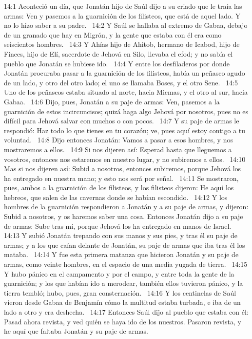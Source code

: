 14:1 Aconteció un día, que Jonatán hijo de Saúl dijo a su criado que le traía las armas: Ven y pasemos a la guarnición de los filisteos, que está de aquel lado. Y no lo hizo saber a su padre.  
14:2 Y Saúl se hallaba al extremo de Gabaa, debajo de un granado que hay en Migrón, y la gente que estaba con él era como seiscientos hombres.  
14:3 Y Ahías hijo de Ahitob, hermano de Icabod, hijo de Finees, hijo de Elí, sacerdote de Jehová en Silo, llevaba el efod; y no sabía el pueblo que Jonatán se hubiese ido.  
14:4 Y entre los desfiladeros por donde Jonatán procuraba pasar a la guarnición de los filisteos, había un peñasco agudo de un lado, y otro del otro lado; el uno se llamaba Boses, y el otro Sene.  
14:5 Uno de los peñascos estaba situado al norte, hacia Micmas, y el otro al sur, hacia Gabaa.  
14:6 Dijo, pues, Jonatán a su paje de armas: Ven, pasemos a la guarnición de estos incircuncisos; quizá haga algo Jehová por nosotros, pues no es difícil para Jehová salvar con muchos o con pocos.  
14:7 Y su paje de armas le respondió: Haz todo lo que tienes en tu corazón; ve, pues aquí estoy contigo a tu voluntad.  
14:8 Dijo entonces Jonatán: Vamos a pasar a esos hombres, y nos mostraremos a ellos.  
14:9 Si nos dijeren así: Esperad hasta que lleguemos a vosotros, entonces nos estaremos en nuestro lugar, y no subiremos a ellos.  
14:10 Mas si nos dijeren así: Subid a nosotros, entonces subiremos, porque Jehová los ha entregado en nuestra mano; y esto nos será por señal.  
14:11 Se mostraron, pues, ambos a la guarnición de los filisteos, y los filisteos dijeron: He aquí los hebreos, que salen de las cavernas donde se habían escondido.  
14:12 Y los hombres de la guarnición respondieron a Jonatán y a su paje de armas, y dijeron: Subid a nosotros, y os haremos saber una cosa. Entonces Jonatán dijo a su paje de armas: Sube tras mí, porque Jehová los ha entregado en manos de Israel.  
14:13 Y subió Jonatán trepando con sus manos y sus pies, y tras él su paje de armas; y a los que caían delante de Jonatán, su paje de armas que iba tras él los mataba.  
14:14 Y fue esta primera matanza que hicieron Jonatán y su paje de armas, como veinte hombres, en el espacio de una media yugada de tierra.  
14:15 Y hubo pánico en el campamento y por el campo, y entre toda la gente de la guarnición; y los que habían ido a merodear, también ellos tuvieron pánico, y la tierra tembló; hubo, pues, gran consternación.  
14:16 Y los centinelas de Saúl vieron desde Gabaa de Benjamín cómo la multitud estaba turbada, e iba de un lado a otro y era deshecha.  
14:17 Entonces Saúl dijo al pueblo que estaba con él: Pasad ahora revista, y ved quién se haya ido de los nuestros. Pasaron revista, y he aquí que faltaba Jonatán y su paje de armas.  
